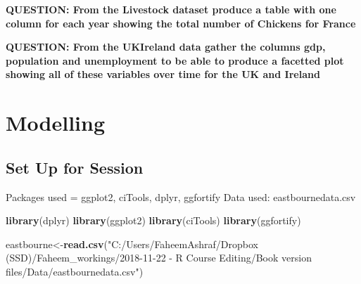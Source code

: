 \documentclass[]{book}
\newenvironment{Shaded}{\begin{snugshade}}{\end{snugshade}}
\newcommand{\KeywordTok}[1]{\textcolor[rgb]{0.13,0.29,0.53}{\textbf{#1}}}
\newcommand{\NormalTok}[1]{#1}
\newcommand{\OperatorTok}[1]{\textcolor[rgb]{0.81,0.36,0.00}{\textbf{#1}}}
\newcommand{\StringTok}[1]{\textcolor[rgb]{0.31,0.60,0.02}{#1}}
\begin{document}
\textbf{QUESTION: From the Livestock dataset produce a table with one column for each year showing the total number of Chickens for France}

\begin{Shaded}
\end{Shaded}

\textbf{QUESTION: From the UKIreland data gather the columns gdp, population and unemployment to be able to produce a facetted plot showing all of these variables over time for the UK and Ireland}

\begin{Shaded}
\end{Shaded}

\hypertarget{modelling}{%
\chapter{Modelling}\label{modelling}}

\hypertarget{set-up-for-session-2}{%
\section{Set Up for Session}\label{set-up-for-session-2}}

Packages used = ggplot2, ciTools, dplyr, ggfortify
Data used: eastbournedata.csv

\begin{Shaded}
\begin{Highlighting}[]
\KeywordTok{library}\NormalTok{(dplyr)}
\KeywordTok{library}\NormalTok{(ggplot2)}
\KeywordTok{library}\NormalTok{(ciTools)}
\KeywordTok{library}\NormalTok{(ggfortify)}

\NormalTok{eastbourne<-}\KeywordTok{read.csv}\NormalTok{(}\StringTok{"C:/Users/FaheemAshraf/Dropbox (SSD)/Faheem_workings/2018-11-22 - R Course Editing/Book version files/Data/eastbournedata.csv"}\NormalTok{)}
\end{Highlighting}
\end{Shaded}
\end{document}
